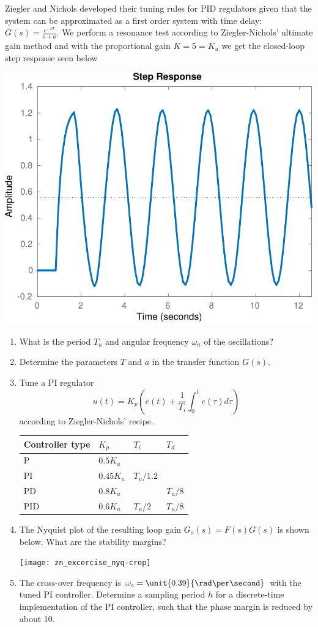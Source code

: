 \documentclass[letterpaper]{scrartcl}
\begin{document}
Ziegler and Nichols developed their tuning rules for PID
regulators given that the system can be approximated as a first order system with time delay:
\( G(s) = \frac{e^{-sT}}{s+a} \).
We perform a resonance test according to Ziegler-Nichols' ultimate gain method and
with the proportional gain $K = 5 = K_u$ we get the closed-loop step response seen below
\begin{center}
\includegraphics[width=0.4\linewidth]{../figures/zn_excercise_step-crop}
\end{center}
\begin{enumerate}
\item What is the period \(T_u\) and angular frequency \(\omega_u\) of the oscillations?
\item Determine the parameters  \(T\) and \(a\) in the transfer function \(G(s)\).
\item Tune a PI regulator \[u(t)=K_{p}\left(e(t)+{\frac{1}{T_{i}}}\int _{0}^{t}e(\tau )d\tau \right)\] according to Ziegler-Nichols' recipe.

\begin{center}
\begin{tabular}{llll}
Controller type & \(K_p\) & \(T_i\) & \(T_d\)\\
\hline
P & \(0.5 K_u\) &  & \\
PI & \(0.45 K_u\) & \(T_u/1.2\) & \\
PD & \(0.8 K_u\) &  & \(T_u/8\)\\
PID & \(0.6 K_u\) & \(T_u/2\) & \(T_u/8\)\\
\hline
\end{tabular}
\end{center}
\item The Nyquist plot of the resulting loop gain \(G_o(s) = F(s)G(s)\) is shown below. What are the stability margins?
\begin{center}
\texttt{[image: zn\_excercise\_nyq-crop]}
\end{center}
\item The cross-over frequency is \(\omega_c = \unit{0.39}{\rad\per\second}\) with the tuned PI controller. Determine a sampling period \(h\) for a discrete-time implementation of the PI controller, such that the phase margin is reduced by about \unit{10}{\degree}.
\end{enumerate}
\end{document}
